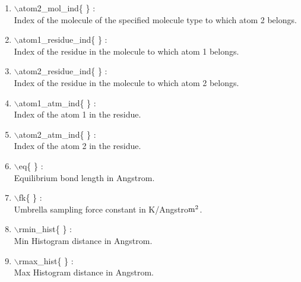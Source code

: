 \begin{itemize}
\begin{enumerate}
 \vspace{0.15in} \Large
 \item  $\backslash$atom2\_mol\_ind\{ \} : \\    
    \large
    Index of the molecule of the specified molecule type 
    to which atom 2 belongs.

 \vspace{0.15in} \Large
 \item  $\backslash$atom1\_residue\_ind\{ \} : \\ 
    \large
    Index of the residue in the molecule to which atom 1 belongs.

 \vspace{0.15in} \Large
 \item  $\backslash$atom2\_residue\_ind\{ \} : \\ 
    \large
    Index of the residue in the molecule to which atom 2 belongs.

 \vspace{0.15in} \Large
 \item  $\backslash$atom1\_atm\_ind\{ \} : \\    
    \large
    Index of the atom 1 in the residue.
 
 \vspace{0.15in} \Large
 \item  $\backslash$atom2\_atm\_ind\{ \} : \\     
    \large
    Index of the atom 2 in the residue.
 
 \vspace{0.15in} \Large
 \item  $\backslash$eq\{ \} : \\               
    \large
    Equilibrium bond length in Angstrom.
  
 \vspace{0.15in} \Large
 \item  $\backslash$fk\{ \} : \\               
    \large
    Umbrella sampling force constant in K/Angstro${\rm m}^2$.

 \vspace{0.15in} \Large
 \item  $\backslash$rmin\_hist\{ \} : \\         
    \large
    Min Histogram distance in Angstrom.

 \vspace{0.15in} \Large
 \item  $\backslash$rmax\_hist\{ \} : \\         
    \large
    Max Histogram distance in Angstrom.


\end{enumerate}
\end{itemize}

